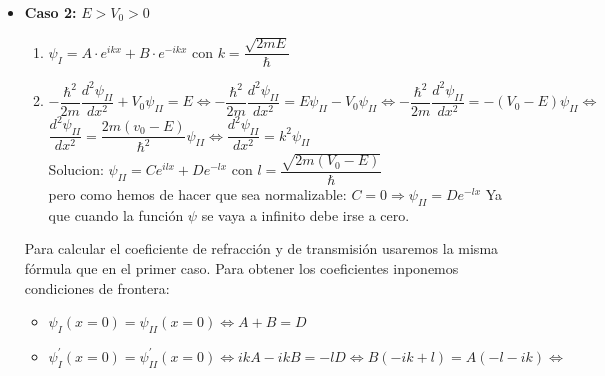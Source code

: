 \documentclass{report}
\begin{document}
{\begin{itemize}
                  Sabemos que clásicamente $R=0$ y que $T=1$, pero en el caso cuántico no sucede
                  así ya que existe cierta probabilidad de que exista reflexión aunque la partícula
                  tenga una energía superior a la del pozo/pared.

                  R en función de la energía: $R=\dfrac{4mE-2mU-4m\sqrt{E(E-U)}}{4mE-2mU+4m\sqrt{E(E-U)}}$

                  La representación de $R$ con $T$ es interesante: %
            \item \textbf{Caso 2:} $E>V_0>0$
            
                  \begin{enumerate}
                    \item $\psi_I=A\cdot e^{ikx}+B\cdot e^{-ikx}$ con $k=\dfrac{\sqrt{2mE}}{\hbar}$\\
                    
                    \item $-\dfrac{\hbar^2}{2m}\dfrac{d^2\psi_{II}}{dx^2}+V_0\psi_{II}=E\Longleftrightarrow
                          -\dfrac{\hbar^2}{2m}\dfrac{d^2\psi_{II}}{dx^2}=E\psi_{II}-V_0\psi_{II}\Longleftrightarrow
                          -\dfrac{\hbar^2}{2m}\dfrac{d^2\psi_{II}}{dx^2}=-(V_0-E)\psi_{II}\Longleftrightarrow$ \\
                          
                          $\dfrac{d^2\psi_{II}}{dx^2}=\dfrac{2m(v_0-E)}{\hbar^2}\psi_{II}\Longleftrightarrow
                          \dfrac{d^2\psi_{II}}{dx^2}=k^2\psi_{II}$\\

                          Solucion: $\psi_{II}=Ce^{ilx}+De^{-lx}$ con $l=\dfrac{\sqrt{2m(V_0-E)}}{\hbar}$\\
                          pero como hemos de hacer que sea normalizable: $C=0\Longrightarrow \psi_{II}=De^{-lx}$
                          Ya que cuando la función $\psi$ se vaya a infinito debe irse a cero.
                  \end{enumerate}
                  Para calcular el coeficiente de refracción y de transmisión usaremos la misma fórmula que
                  en el primer caso. Para obtener los coeficientes inponemos condiciones de frontera:
                  \begin{itemize}
                    \item $\psi_{I}(x=0)=\psi_{II}(x=0) \Longleftrightarrow A+B=D$
                    \item $\psi_{I}^\prime(x=0)=\psi_{II}^\prime(x=0) \Longleftrightarrow ikA-ikB=-lD
                          \Longleftrightarrow B(-ik+l)=A(-l-ik) \Longleftrightarrow$ 


\end{itemize}
\end{itemize}}
\end{document}
